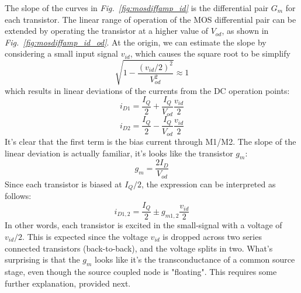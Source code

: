 The slope of the curves in \emph{Fig.~\ref{fig:mosdiffamp_id}} is the differential pair $G_m$ for each transistor.   The linear range of operation of the MOS differential pair can be extended by operating the transistor at a higher value of $V_{od}$, as shown in \emph{Fig.~\ref{fig:mosdiffamp_id_od}}.   At the origin, we can estimate the slope by considering a small input signal $v_{id}$, which causes the square root to be simplify
    \begin{equation} 
        \sqrt {1 - \frac{{{{({v_{id}}/2)}^2}}}{{V_{od}^2}}}  \approx 1
    \end{equation}
which results in linear deviations of the currents from the DC operation points:
    \begin{equation} 
        {i_{D1}} = \frac{I_Q}{2} + \frac{I_Q}{{{V_{od}}}}\frac{{{v_{id}}}}{2} 
    \end{equation}
    \begin{equation} 
        {i_{D2}} = \frac{I_Q}{2} - \frac{I_Q}{{{V_{od}}}}\frac{{{v_{id}}}}{2}
    \end{equation}
It's clear that the first term is the bias current through M1/M2.  The slope of the linear deviation is actually familiar, it's looks like the transistor $g_m$:
    \begin{equation}
        g_m = \frac{2 I_D}{V_{od}}
    \end{equation}
Since each transistor is biased at $I_Q/2$, the expression can be interpreted as follows:
    \begin{equation} 
        {i_{D1,2}} = \frac{I_Q}{2} \pm g_{m1,2} \frac{{{v_{id}}}}{2}
    \end{equation}
In other words, each transistor is excited in the small-signal with a voltage of $v_{id}/2$.  This is expected since the voltage $v_{id}$ is dropped across two series connected transistors (back-to-back), and the voltage splits in two.  What's surprising is that the $g_m$ looks like it's the transconductance of a common source stage, even though the source coupled node is "floating".  This requires some further explanation, provided next.
